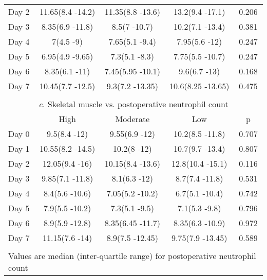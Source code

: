 \begin{table}[p]
\begin{tabular}{|l c c c c |}
		Day 2 & 11.65(8.4 -14.2) & 11.35(8.8 -13.6)  & 13.2(9.4 -17.1)   & 0.206                        \\
		Day 3 & 8.35(6.9 -11.8)  & 8.5(7 -10.7)      & 10.2(7.1 -13.4)   & 0.381                        \\
		Day 4 & 7(4.5 -9)        & 7.65(5.1 -9.4)    & 7.95(5.6 -12)     & 0.247                        \\
		Day 5 & 6.95(4.9 -9.65)  & 7.3(5.1 -8.3)     & 7.75(5.5 -10.7)   & 0.247                        \\
		Day 6 & 8.35(6.1 -11)    & 7.45(5.95 -10.1)  & 9.6(6.7 -13)      & 0.168                        \\
		Day 7 & 10.45(7.7 -12.5) & 9.3(7.2 -13.35)   & 10.6(8.25 -13.65) & 0.475                        \\ \hline
		                                     \multicolumn{5}{c}{}                                       \\
		      \multicolumn{5}{c}{\textit{c.} Skeletal muscle vs. postoperative neutrophil count}        \\ \hline
		      & High             & Moderate          & Low               & p                            \\
		Day 0 & 9.5(8.4 -12)     & 9.55(6.9 -12)     & 10.2(8.5 -11.8)   & 0.707                        \\
		Day 1 & 10.55(8.2 -14.5) & 10.2(8 -12)       & 10.7(9.7 -13.4)   & 0.807                        \\
		Day 2 & 12.05(9.4 -16)   & 10.15(8.4 -13.6)  & 12.8(10.4 -15.1)  & 0.116                        \\
		Day 3 & 9.85(7.1 -11.8)  & 8.1(6.3 -12)      & 8.7(7.4 -11.8)    & 0.531                        \\
		Day 4 & 8.4(5.6 -10.6)   & 7.05(5.2 -10.2)   & 6.7(5.1 -10.4)    & 0.742                        \\
		Day 5 & 7.9(5.5 -10.2)   & 7.3(5.1 -9.5)     & 7.1(5.3 -9.8)     & 0.796                        \\
		Day 6 & 8.9(5.9 -12.8)   & 8.35(6.45 -11.7)  & 8.35(6.3 -10.9)   & 0.972                        \\
		Day 7 & 11.15(7.6 -14)   & 8.9(7.5 -12.45)   & 9.75(7.9 -13.45)  & 0.589                        \\ \hline
		                                     \multicolumn{5}{c}{}                                       \\
		\multicolumn{5}{l}{Values are median (inter-quartile range) for postoperative neutrophil count}
	\end{tabular}	
\end{table}






